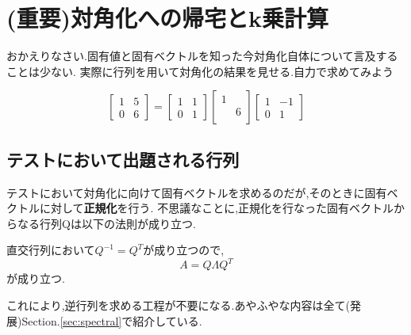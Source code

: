 \section{(重要)対角化への帰宅とk乗計算}
おかえりなさい.固有値と固有ベクトルを知った今対角化自体について言及することは少ない.
実際に行列を用いて対角化の結果を見せる.自力で求めてみよう
\begin{framed}
\[
    \begin{bmatrix}
        1 & 5 \\ 0 & 6
    \end{bmatrix}=
    \begin{bmatrix}
        1 & 1 \\ 0 & 1
    \end{bmatrix}
    \begin{bmatrix}
        1 & \\ & 6\\
    \end{bmatrix}
    \begin{bmatrix}
        1 & -1  \\ 0 & 1
    \end{bmatrix}
\]
\end{framed}
\subsection{テストにおいて出題される行列}
テストにおいて対角化に向けて固有ベクトルを求めるのだが,そのときに固有ベクトルに対して\textbf{正規化}を行う.
不思議なことに,正規化を行なった固有ベクトルからなる行列Qは以下の法則が成り立つ.
\begin{tcolorbox}[colframe=black!80,colback=white,title=直交行列Qと対角化]
    直交行列において$Q^{-1}=Q^T$が成り立つので,
\[
    A = Q\Lambda Q^T 
\]
が成り立つ.
\end{tcolorbox}
これにより,逆行列を求める工程が不要になる.あやふやな内容は全て(発展)Section.\ref{sec:spectral}で紹介している.\bigskip\\

